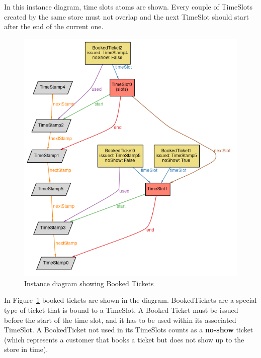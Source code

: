 
In this instance diagram, time slots atoms are shown. Every couple of TimeSlots created by the same store must not overlap and the next TimeSlot should start after the end of the current one.

\vfill
\pagebreak

\begin{figure}[H]
    \includegraphics[width=\textwidth]{Images/alloy_3_booked.png}
    \caption{\label{fig:Alloy_2}Instance diagram showing Booked Tickets}
\end{figure}
In Figure~\ref{fig:Alloy_2} booked tickets are shown in the diagram. BookedTickets are a special type of ticket that is bound to a TimeSlot. A Booked Ticket must be issued before the start of the time slot, and it has to be used within its associated TimeSlot. A BookedTicket not used in its TimeSlots counts as a \textbf{no-show} ticket (which represents a customer that books a ticket but does not show up to the store in time).

\vfill
\pagebreak

